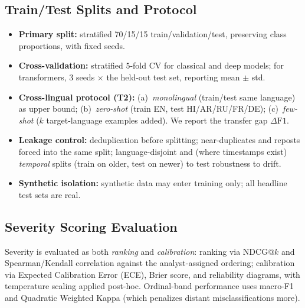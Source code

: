 \documentclass[11pt,a4paper]{article}
\begin{document}
\subsection{Train/Test Splits and Protocol}\label{sec:method-splits}
\begin{itemize}[leftmargin=1.5em,itemsep=1pt]
  \item \textbf{Primary split:} stratified 70/15/15 train/validation/test, preserving
  class proportions, with fixed seeds.
  \item \textbf{Cross-validation:} stratified $5$-fold CV for classical and deep models;
  for transformers, $3$ seeds $\times$ the held-out test set, reporting mean $\pm$ std.
  \item \textbf{Cross-lingual protocol (T2):} (a)~\emph{monolingual} (train/test same
  language) as upper bound; (b)~\emph{zero-shot} (train EN, test HI/AR/RU/FR/DE);
  (c)~\emph{few-shot} ($k$ target-language examples added). We report the transfer gap
  $\Delta\text{F1}$.
  \item \textbf{Leakage control:} deduplication before splitting; near-duplicates and
  reposts forced into the same split; language-disjoint and (where timestamps exist)
  \emph{temporal} splits (train on older, test on newer) to test robustness to drift.
  \item \textbf{Synthetic isolation:} synthetic data may enter training only; all
  headline test sets are real.
\end{itemize}

\subsection{Severity Scoring Evaluation}\label{sec:method-severity}
Severity is evaluated as both \emph{ranking} and \emph{calibration}: ranking via
NDCG@$k$ and Spearman/Kendall correlation against the analyst-assigned ordering;
calibration via Expected Calibration Error (ECE), Brier score, and reliability diagrams,
with temperature scaling applied post-hoc. Ordinal-band performance uses
macro-F1 and Quadratic Weighted Kappa (which penalizes distant misclassifications more).

\end{document}
